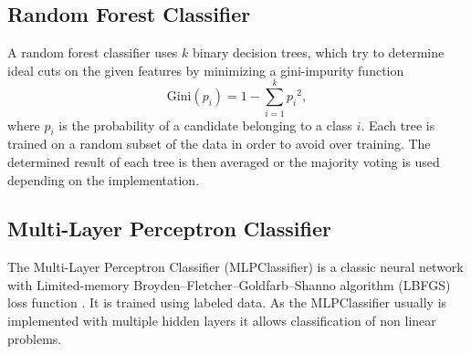 \subsection{Random Forest Classifier}
A random forest classifier uses $k$ binary decision trees, which try to determine ideal cuts on the given features by minimizing a gini-impurity function
\begin{equation*}
	\mathrm{Gini}(p_i) = 1 - \sum_{i=1}^{k}{p_i}^2,
\end{equation*}
where $p_i$ is the probability of a candidate belonging to a class $i$.
Each tree is trained on a random subset of the data in order to avoid over training. 
The determined result of each tree is then averaged or the majority voting is used depending on the implementation. 

\subsection{Multi-Layer Perceptron Classifier}
The Multi-Layer Perceptron Classifier (MLPClassifier) is a classic neural network with Limited-memory Broyden–Fletcher–Goldfarb–Shanno algorithm (LBFGS) loss function \cite{Lossfueicecube}. It is trained using labeled data. As the MLPClassifier usually is implemented with multiple hidden layers it allows classification of non linear problems.

